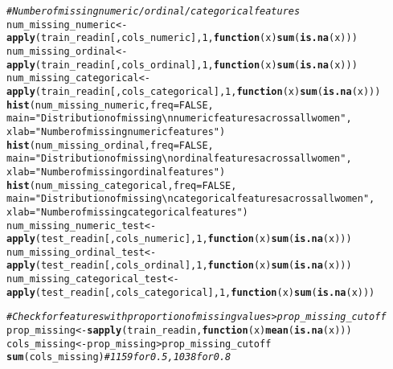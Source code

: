 \documentclass{article}\usepackage[]{graphicx}\usepackage[]{color}
\makeatletter
\newcommand{\hlnum}[1]{\textcolor[rgb]{0.686,0.059,0.569}{#1}}%
\newcommand{\hlstr}[1]{\textcolor[rgb]{0.192,0.494,0.8}{#1}}%
\newcommand{\hlcom}[1]{\textcolor[rgb]{0.678,0.584,0.686}{\textit{#1}}}%
\newcommand{\hlopt}[1]{\textcolor[rgb]{0,0,0}{#1}}%
\newcommand{\hlstd}[1]{\textcolor[rgb]{0.345,0.345,0.345}{#1}}%
\newcommand{\hlkwa}[1]{\textcolor[rgb]{0.161,0.373,0.58}{\textbf{#1}}}%
\newcommand{\hlkwb}[1]{\textcolor[rgb]{0.69,0.353,0.396}{#1}}%
\newcommand{\hlkwc}[1]{\textcolor[rgb]{0.333,0.667,0.333}{#1}}%
\newcommand{\hlkwd}[1]{\textcolor[rgb]{0.737,0.353,0.396}{\textbf{#1}}}%
\newenvironment{kframe}{%
 \def\at@end@of@kframe{}%
 \ifinner\ifhmode%
  \def\at@end@of@kframe{\end{minipage}}%
  \begin{minipage}{\columnwidth}%
 \fi\fi%
 \def\FrameCommand##1{\hskip\@totalleftmargin \hskip-\fboxsep
 \colorbox{shadecolor}{##1}\hskip-\fboxsep
     \hskip-\linewidth \hskip-\@totalleftmargin \hskip\columnwidth}%
 \MakeFramed {\advance\hsize-\width
   \@totalleftmargin\z@ \linewidth\hsize
   \@setminipage}}%
 {\par\unskip\endMakeFramed%
 \at@end@of@kframe}
\newenvironment{knitrout}{}{} %
\makeatother
\begin{document}
\begin{knitrout}
\begin{kframe}
\begin{alltt}
\hlcom{# Number of missing numeric/ordinal/categorical features}
\hlstd{num_missing_numeric} \hlkwb{<-} \hlkwd{apply}\hlstd{(train_readin[, cols_numeric],} \hlnum{1}\hlstd{,} \hlkwa{function}\hlstd{(}\hlkwc{x}\hlstd{)} \hlkwd{sum}\hlstd{(}\hlkwd{is.na}\hlstd{(x)))}
\hlstd{num_missing_ordinal} \hlkwb{<-} \hlkwd{apply}\hlstd{(train_readin[, cols_ordinal],} \hlnum{1}\hlstd{,} \hlkwa{function}\hlstd{(}\hlkwc{x}\hlstd{)} \hlkwd{sum}\hlstd{(}\hlkwd{is.na}\hlstd{(x)))}
\hlstd{num_missing_categorical} \hlkwb{<-} \hlkwd{apply}\hlstd{(train_readin[, cols_categorical],} \hlnum{1}\hlstd{,} \hlkwa{function}\hlstd{(}\hlkwc{x}\hlstd{)} \hlkwd{sum}\hlstd{(}\hlkwd{is.na}\hlstd{(x)))}
\hlkwd{hist}\hlstd{(num_missing_numeric,} \hlkwc{freq} \hlstd{=} \hlnum{FALSE}\hlstd{,}
     \hlkwc{main} \hlstd{=} \hlstr{"Distribution of missing\textbackslash{}nnumeric features across all women"}\hlstd{,}
     \hlkwc{xlab} \hlstd{=} \hlstr{"Number of missing numeric features"}\hlstd{)}
\hlkwd{hist}\hlstd{(num_missing_ordinal,} \hlkwc{freq} \hlstd{=} \hlnum{FALSE}\hlstd{,}
     \hlkwc{main} \hlstd{=} \hlstr{"Distribution of missing\textbackslash{}nordinal features across all women"}\hlstd{,}
     \hlkwc{xlab} \hlstd{=} \hlstr{"Number of missing ordinal features"}\hlstd{)}
\hlkwd{hist}\hlstd{(num_missing_categorical,} \hlkwc{freq} \hlstd{=} \hlnum{FALSE}\hlstd{,}
     \hlkwc{main} \hlstd{=} \hlstr{"Distribution of missing\textbackslash{}ncategorical features across all women"}\hlstd{,}
     \hlkwc{xlab} \hlstd{=} \hlstr{"Number of missing categorical features"}\hlstd{)}
\hlstd{num_missing_numeric_test} \hlkwb{<-} \hlkwd{apply}\hlstd{(test_readin[, cols_numeric],} \hlnum{1}\hlstd{,} \hlkwa{function}\hlstd{(}\hlkwc{x}\hlstd{)} \hlkwd{sum}\hlstd{(}\hlkwd{is.na}\hlstd{(x)))}
\hlstd{num_missing_ordinal_test} \hlkwb{<-} \hlkwd{apply}\hlstd{(test_readin[, cols_ordinal],} \hlnum{1}\hlstd{,} \hlkwa{function}\hlstd{(}\hlkwc{x}\hlstd{)} \hlkwd{sum}\hlstd{(}\hlkwd{is.na}\hlstd{(x)))}
\hlstd{num_missing_categorical_test} \hlkwb{<-} \hlkwd{apply}\hlstd{(test_readin[, cols_categorical],} \hlnum{1}\hlstd{,} \hlkwa{function}\hlstd{(}\hlkwc{x}\hlstd{)} \hlkwd{sum}\hlstd{(}\hlkwd{is.na}\hlstd{(x)))}

\hlcom{# Check for features with proportion of missing values > prop_missing_cutoff}
\hlstd{prop_missing} \hlkwb{<-} \hlkwd{sapply}\hlstd{(train_readin,} \hlkwa{function}\hlstd{(}\hlkwc{x}\hlstd{)} \hlkwd{mean}\hlstd{(}\hlkwd{is.na}\hlstd{(x)))}
\hlstd{cols_missing} \hlkwb{<-} \hlstd{prop_missing} \hlopt{>} \hlstd{prop_missing_cutoff}
\hlkwd{sum}\hlstd{(cols_missing)} \hlcom{# 1159 for 0.5, 1038 for 0.8}


\end{alltt}
\end{kframe}
\end{knitrout}
\end{document}
